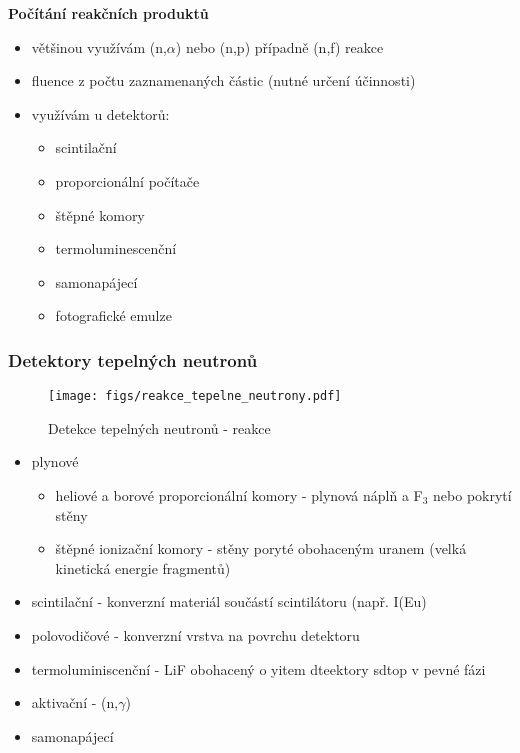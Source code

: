 \textbf{Počítání reakčních produktů}
\begin{itemize}
    \item většinou využívám (n,$\alpha$) nebo (n,p) případně (n,f) reakce
    \item fluence z počtu zaznamenaných částic (nutné určení účinnosti)
    \item využívám u detektorů:
    \begin{itemize}
        \item scintilační
        \item proporcionální počítače
        \item štěpné komory
        \item termoluminescenční
        \item samonapájecí
        \item fotografické emulze
    \end{itemize}
    
\end{itemize}
\subsubsection{Detektory tepelných neutronů}

\begin{figure}[ht!]
    \centering
    \texttt{[image: figs/reakce\_tepelne\_neutrony.pdf]}
    \caption{Detekce tepelných neutronů - reakce}
    \label{fig:2_12_reakce_tepelne_neutrony}
    
\end{figure}
\begin{itemize}
    \item plynové
    \begin{itemize}
        \item heliové a borové proporcionální komory - plynová náplň  a F$_3$ nebo pokrytí stěny 
        \item štěpné ionizační komory - stěny poryté obohaceným uranem (velká kinetická energie fragmentů)
        
        
    \end{itemize}
    \item scintilační - konverzní materiál součástí scintilátoru (např. I(Eu)
    \item polovodičové - konverzní vrstva na povrchu detektoru
    \item termoluminiscenční - LiF obohacený o 
    yitem dteektory sdtop v pevné fázi
    \item aktivační - (n,$\gamma$)
    \item samonapájecí
\end{itemize}

